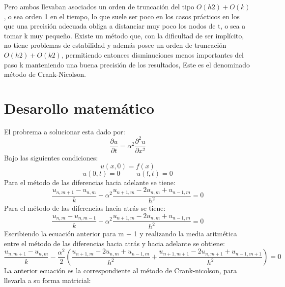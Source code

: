 \documentclass[11pt]{article} %
\begin{document}
Pero ambos llevaban asociados un orden de truncación del tipo $O(h2) + O(k)$, o sea orden 1 en el tiempo, lo que suele ser poco en los casos prácticos en los que una precisión adecuada obliga a distanciar muy poco los nodos de t, o sea a tomar k muy pequeño. Existe un método que, con la dificultad de ser implícito, no tiene problemas de estabilidad y además posee un orden de truncación $O(h2) + O(k2)$, permitiendo entonces disminuciones menos importantes del paso k manteniendo una buena precisión de los resultados, Este es el denominado método de Crank-Nicolson.


\section*{Desarollo matemático}

El probrema a solucionar esta dado por:
$$\frac{\partial u}{\partial t}=\alpha^2\frac{\partial^2 u}{\partial x^2}$$
Bajo las siguientes condiciones:
$$u(x,0)=f(x)$$
$$u(0,t)=0\hspace{1cm}u(l,t)=0$$
Para el método de las diferencias hacia adelante se tiene:
$$\frac{u_{n,m+1}-u_{n,m}}{k}-\alpha^2\frac{u_{n+1,m}-2u_{n,m}+u_{n-1,m}}{h^2}=0$$
Para el método de las diferencias hacia atrás se tiene: 
$$\frac{u_{n,m}-u_{n,m-1}}{k}-\alpha^2\frac{u_{n+1,m}-2u_{n,m}+u_{n-1,m}}{h^2}=0$$
Escribiendo la ecuación anterior para m + 1 y realizando la media aritmética entre el método de las diferencias hacia atrás y hacia adelante se obtiene: 
$$\frac{u_{n,m+1}-u_{n,m}}{k}-\frac{\alpha^2}{2}(\frac{u_{n+1,m}-2u_{n,m}+u_{n-1,m}}{h^2}+\frac{u_{n+1,m+1}-2u_{n,m+1}+u_{n-1,m+1}}{h^2})=0$$
La anterior ecuación es la correspondiente al método de Crank-nicolson, para llevarla a su forma matricial:
\end{document}
